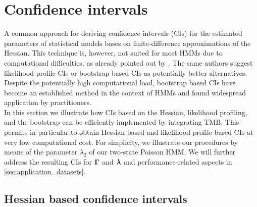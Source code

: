 \documentclass[bimj,fleqn]{w-art}\usepackage[]{graphicx}\usepackage[]{color}
\newcommand{\bgamma}{\mbox{\boldmath $\Gamma$}}
\newcommand{\bflambda}{\mbox{\boldmath $\lambda$}}
\theoremstyle{plain}
\theoremstyle{definition}
\begin{document}
\section{Confidence intervals}
\label{sec:confint}

A common approach for deriving confidence intervals (CIs) for the estimated parameters of statistical models bases on finite-difference approximations of the Hessian. This technique is, however, not suited for most HMMs due to computational difficulties, as already pointed out by \citet{visser}. The same authors suggest likelihood profile CIs or bootstrap based CIs as potentially better alternatives. Despite the potentially high computational load, bootstrap based CIs have become an established method in the context of HMMs \citep{bulla, zucchini} and found widespread application by practitioners.\\
In this section we illustrate how CIs based on the Hessian, likelihood profiling, and the bootstrap can be efficiently implemented by integrating TMB.
This permits in particular to obtain Hessian based and likelihood profile based CIs at very low computational cost. For simplicity, we illustrate our procedures by means of the parameter $\lambda_2$ of our two-state Poisson HMM. We will further address the resulting CIs for $\bgamma$ and $\bflambda$ and performance-related aspects in \autoref{sec:application_datasets}.


\subsection{Hessian based confidence intervals}
\label{sec:hessian}
\end{document}
